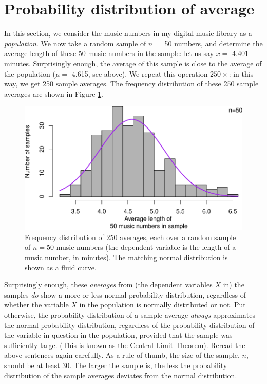 \documentclass[
]{book}
\begin{document}
\hypertarget{sec:Centrallimittheorem}{%
\section{Probability distribution of average}\label{sec:Centrallimittheorem}}

In this section, we consider the music numbers in my digital
music library as a \emph{population}. We now take a random
sample of \(n=\) 50 numbers, and determine the average length of these
50 music numbers in the sample:
let us say \(\bar{x} =\) 4.401 minutes. Surprisingly
enough, the average of this sample is close to the average
of the population (\(\mu =\) 4.615, see above).
We repeat this operation
\(250\times\): in this way, we get 250 sample averages. The
frequency distribution of these 250 sample averages are shown in
Figure \ref{fig:itunesmeanshist}.

\begin{figure}
\centering
\includegraphics{QMS-EN_files/figure-latex/itunesmeanshist-1.pdf}
\caption{\label{fig:itunesmeanshist}Frequency distribution of 250 averages, each over a random sample of \(n=50\) music numbers (the dependent variable is the length of a music number, in minutes). The matching normal distribution is shown as a fluid curve.}
\end{figure}

Surprisingly enough, these \emph{averages} from (the dependent variables
\(X\) in) the samples \emph{do} show a more or less normal probability distribution,
regardless of whether the variable \(X\) in the population is normally distributed or
not. Put otherwise, the probability distribution of a sample average \emph{always}
approximates the normal probability distribution, regardless of the probability
distribution of the variable in question in the population, provided that the sample
was sufficiently large. (This is known as the Central Limit Theorem). Reread the
above sentences again carefully. As a rule of thumb, the size of the sample, \(n\),
should be at least 30. The larger the sample is, the less the probability
distribution of the sample averages deviates from the normal distribution.
\end{document}
